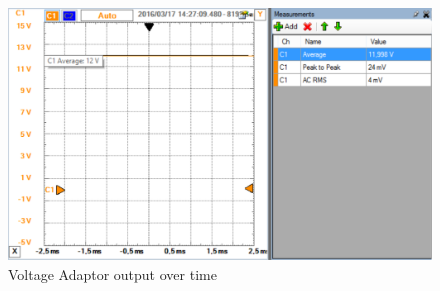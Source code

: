 \begin{figure}[H]
	\centering
	\includegraphics[width=0.9\linewidth]{Hardware/Pictures/VoltageAdaptor_test}
	\caption{Voltage Adaptor output over time}
	\label{fig:VoltageAdaptor_test}
\end{figure}